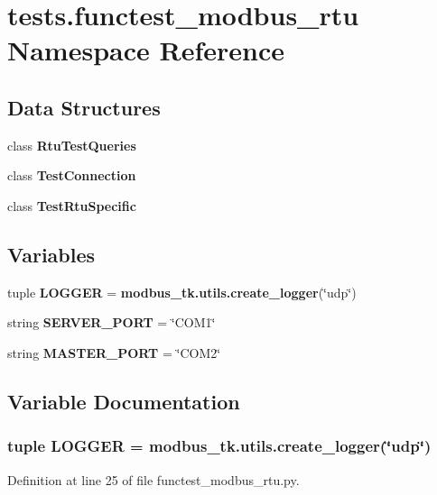 \section{tests.\+functest\+\_\+modbus\+\_\+rtu Namespace Reference}
\label{namespacetests_1_1functest__modbus__rtu}
\subsection*{Data Structures}
\begin{DoxyCompactItemize}
\item 
class {\bf Rtu\+Test\+Queries}
\item 
class {\bf Test\+Connection}
\item 
class {\bf Test\+Rtu\+Specific}
\end{DoxyCompactItemize}
\subsection*{Variables}
\begin{DoxyCompactItemize}
\item 
tuple {\bf L\+O\+G\+G\+E\+R} = {\bf modbus\+\_\+tk.\+utils.\+create\+\_\+logger}(\char`\"{}udp\char`\"{})
\item 
string {\bf S\+E\+R\+V\+E\+R\+\_\+\+P\+O\+R\+T} = \char`\"{}C\+O\+M1\char`\"{}
\item 
string {\bf M\+A\+S\+T\+E\+R\+\_\+\+P\+O\+R\+T} = \char`\"{}C\+O\+M2\char`\"{}
\end{DoxyCompactItemize}


\subsection{Variable Documentation}
\subsubsection[{L\+O\+G\+G\+E\+R}]{\setlength{\rightskip}{0pt plus 5cm}tuple L\+O\+G\+G\+E\+R = {\bf modbus\+\_\+tk.\+utils.\+create\+\_\+logger}(\char`\"{}udp\char`\"{})}\label{namespacetests_1_1functest__modbus__rtu_ae9c29667350ae00a0837fc1e77c279e2}


Definition at line 25 of file functest\+\_\+modbus\+\_\+rtu.\+py.

